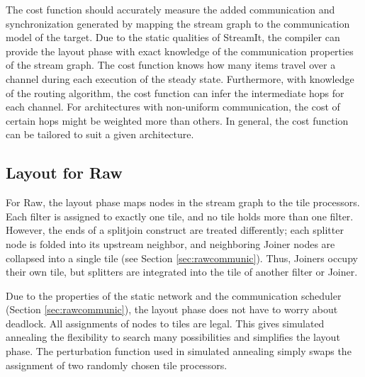 
The cost function should accurately measure the added communication
and synchronization generated by mapping the stream graph to the
communication model of the target.  Due to the static qualities of
StreamIt, the compiler can provide the layout phase with exact
knowledge of the communication properties of the stream graph.  The
cost function knows how many items travel over a channel during each
execution of the steady state.  Furthermore, with knowledge of the
routing algorithm, the cost function can infer the intermediate hops
for each channel.  For architectures with non-uniform communication,
the cost of certain hops might be weighted more than others.  In
general, the cost function can be tailored to suit a given
architecture.



\subsection{Layout for Raw}

For Raw, the layout phase maps nodes in the stream graph to the tile
processors.  Each filter is assigned to exactly one tile, and no tile
holds more than one filter.  However, the ends of a splitjoin
construct are treated differently; each splitter node is folded into
its upstream neighbor, and neighboring Joiner nodes are collapsed into
a single tile (see Section \ref{sec:rawcommunic}).  Thus, Joiners
occupy their own tile, but splitters are integrated into the tile of
another filter or Joiner.

Due to the properties of the static network and the communication
scheduler (Section \ref{sec:rawcommunic}), the layout phase does not
have to worry about deadlock.  All assignments of nodes to tiles are
legal.  This gives simulated annealing the flexibility to search many
possibilities and simplifies the layout phase.  The perturbation
function used in simulated annealing simply swaps the assignment of
two randomly chosen tile processors.

